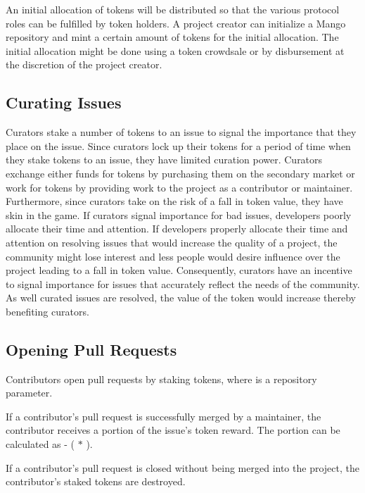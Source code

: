 An initial allocation of tokens will be distributed so that the various protocol
roles can be fulfilled by token holders. A project creator can initialize a Mango repository and mint a certain amount of
tokens for the initial allocation. The initial allocation might be done using a
token crowdsale or by disbursement at the discretion of the project creator.

\subsection{Curating Issues}

Curators stake a number of tokens to an issue to signal the importance that they
place on the issue. Since curators lock up their tokens for a period of time
when they stake tokens to an issue, they have limited curation power. Curators exchange either funds for tokens by purchasing them
on the secondary market or work for tokens by providing work to the project as a
contributor or maintainer. Furthermore, since curators take on the risk of a
fall in token value, they have skin in the game\cite{skininthegame}. If curators
signal importance for bad issues, developers poorly allocate their time and
attention. If developers properly allocate their time and attention on resolving
issues that would increase the quality of a project, the community might lose
interest and less people would desire influence over the project leading to a
fall in token value. Consequently, curators have an incentive to signal
importance for issues that accurately reflect the needs of the community. As
well curated issues are resolved, the value of the token would increase thereby
benefiting curators.

\subsection{Opening Pull Requests}

Contributors open pull requests by staking  tokens,
where  is a repository parameter.

If a contributor's pull request is successfully merged by a maintainer, the
contributor receives a portion of the issue's token reward. The portion can be
calculated as  - ( $*$ ).

If a contributor's pull request is closed without being merged into the project,
the contributor's  staked tokens are destroyed.

